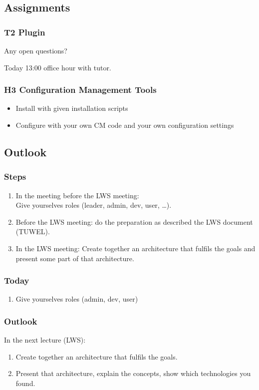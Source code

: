 \subsection{Assignments}

\begin{assignment}
	\frametitle{T2 Plugin}

	Any open questions?

	Today 13:00 office hour with tutor.
\end{assignment}

\begin{assignment}
	\frametitle{H3 Configuration Management Tools}

	\begin{itemize}
	\item Install with given installation scripts
	\item Configure with your own CM code and your own configuration settings
	\end{itemize}
\end{assignment}


\subsection{Outlook}

\begin{frame}
	\frametitle{Steps}

	\begin{enumerate}
		\item In the meeting before the LWS meeting: \\
			Give yourselves roles (leader, admin, dev, user, \dots).
		\item Before the LWS meeting: do the preparation as described the LWS document (TUWEL).
		\item In the LWS meeting: Create together an architecture that fulfils the goals and present some part of that architecture.
	\end{enumerate}
\end{frame}

\begin{frame}
	\frametitle{Today}

	\begin{enumerate}
	\item Give yourselves roles (admin, dev, user)
	\end{enumerate}
\end{frame}

\begin{frame}
	\frametitle{Outlook}

	In the next lecture (LWS):

	\begin{enumerate}
	\item Create together an architecture that fulfils the goals.
	\item Present that architecture, explain the concepts, show which technologies you found.
	\end{enumerate}
\end{frame}



\appendix

\begin{frame}[allowframebreaks]
	
	
\end{frame}




